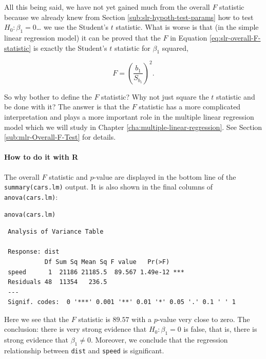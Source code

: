 \documentclass[captions=tableheading]{scrbook}
\begin{document}
All this being said, we have not yet gained much from the overall \(F\) statistic because we already knew from Section \ref{sub:slr-hypoth-test-params} how to test \(H_{0}:\beta_{1}=0\)\ldots{} we use the Student's \(t\) statistic. What is worse is that (in the simple linear regression model) it can be proved that the \(F\) in Equation \ref{eq:slr-overall-F-statistic} is exactly the Student's \(t\) statistic for \(\beta_{1}\) squared,

\begin{equation}
F=\left(\frac{b_{1}}{S_{b_{1}}}\right)^{2}.
\end{equation}

So why bother to define the \(F\) statistic? Why not just square the \(t\) statistic and be done with it? The answer is that the \(F\) statistic has a more complicated interpretation and plays a more important role in the multiple linear regression model which we will study in Chapter \ref{cha:multiple-linear-regression}. See Section \ref{sub:mlr-Overall-F-Test} for details.

\paragraph*{How to do it with \textsf{R}}

The overall \(F\) statistic and \(p\)-value are displayed in the bottom line of the \texttt{summary(cars.lm)} output. It is also shown in the final columns of \texttt{anova(cars.lm)}:


\begin{verbatim}
anova(cars.lm)
\end{verbatim}

\begin{verbatim}
 Analysis of Variance Table
 
 Response: dist
           Df Sum Sq Mean Sq F value   Pr(>F)    
 speed      1  21186 21185.5  89.567 1.49e-12 ***
 Residuals 48  11354   236.5                     
 ---
 Signif. codes:  0 '***' 0.001 '**' 0.01 '*' 0.05 '.' 0.1 ' ' 1
\end{verbatim}



Here we see that the \(F\) statistic is \(  89.57 \) with a \(p\)-value very close to zero. The conclusion: there is very strong evidence that \(H_{0}:\beta_{1} = 0 \) is false, that is, there is strong evidence that \( \beta_{1} \neq 0 \). Moreover, we conclude that the regression relationship between \texttt{dist} and \texttt{speed} is significant.
\end{document}
